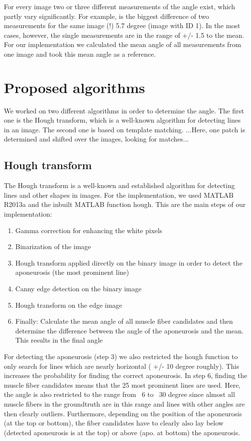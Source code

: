 \documentclass[10pt,twocolumn,letterpaper]{article}
\begin{document}
For every image two or three different measurements of the angle exist, which partly vary significantly. For example, is the biggest difference of two measurements for the same image (!) 5.7 degree (image with ID 1). In the most cases, however, the single measurements are in the range of +/- 1.5 to the mean.
For our implementation we calculated the mean angle of all measurements from one image and took this mean angle as a reference.

\section{Proposed algorithms}
We worked on two different algorithms in order to determine the angle. The first one is the Hough transform, which is a well-known algorithm for detecting lines in an image. The second one is based on template matching. ...Here, one patch is determined and shifted over the images, looking for matches...

\subsection{Hough transform}
The Hough transform is a well-known and established algorithm for detecting lines and other shapes in images. For the implementation, we used MATLAB R2013a and the inbuilt MATLAB function hough.
This are the main steps of our implementation:

\begin{enumerate}
     \item Gamma correction for enhancing the white pixels
     \item Binarization of the image
     \item Hough transform applied directly on the binary image in order to detect the aponeurosis (the most prominent line)
     \item Canny edge detection on the binary image
     \item Hough transform on the edge image
     \item Finally: Calculate the mean angle of all muscle fiber candidates and then determine the difference between the angle of the aponeurosis and the mean. This results in the final angle
\end{enumerate}

For detecting the aponeurosis (step 3) we also restricted the hough function to only search for lines which are nearly horizontal ( +/- 10 degree roughly). This increases the probability for finding the correct aponeurosis. In step 6, finding the muscle fiber candidates means that the 25 most prominent lines are used. Here, the angle is also restricted to the range from ~6 to ~30 degree since almost all muscle fibers in the groundtruth are in this range and lines with other angles are then clearly outliers. Furthermore, depending on the position of the aponeurosis (at the top or bottom), the fiber candidates have to clearly also lay below (detected aponeurosis is at the top) or above (apo. at bottom) the aponeurosis.
\end{document}
